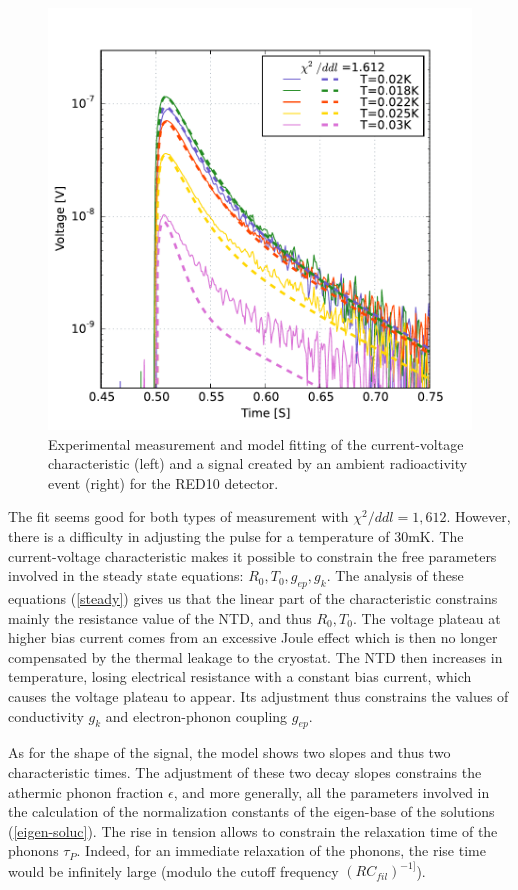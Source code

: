 \begin{figure}[!ht]
\begin{minipage}{0.49\textwidth}
\includegraphics[width=\textwidth]{Images/pulse_red10.pdf}
\end{minipage}
\caption{Experimental measurement and model fitting of the current-voltage characteristic (left) and a signal created by an ambient radioactivity event (right) for the RED10 detector.}
\label{v2i-red10}
\end{figure}

The fit seems good for both types of measurement with $\chi^2/ddl=1,612$. However, there is a difficulty in adjusting the pulse for a temperature of $30$mK. The current-voltage characteristic makes it possible to constrain the free parameters involved in the steady state equations: $R_0, T_0, g_{ep}, g_k$. The analysis of these equations (\ref{steady}) gives us that the linear part of the characteristic constrains mainly the resistance value of the NTD, and thus $R_0, T_0$. The voltage plateau at higher bias current comes from an excessive Joule effect which is then no longer compensated by the thermal leakage to the cryostat. The NTD then increases in temperature, losing electrical resistance with a constant bias current, which causes the voltage plateau to appear. Its adjustment thus constrains the values of conductivity $g_k$ and electron-phonon coupling $g_{ep}$.

As for the shape of the signal, the model shows two slopes and thus two characteristic times. The adjustment of these two decay slopes constrains the athermic phonon fraction $\epsilon$, and more generally, all the parameters involved in the calculation of the normalization constants of the eigen-base of the solutions (\ref{eigen-soluc}).
The rise in tension allows to constrain the relaxation time of the phonons $\tau_P$. Indeed, for an immediate relaxation of the phonons, the rise time would be infinitely large (modulo the cutoff frequency $(RC_{fil})^{-1]}$).

